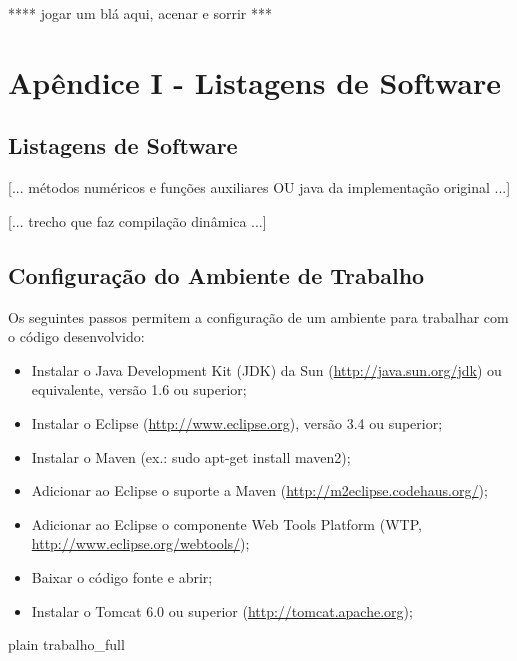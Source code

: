 \documentclass{abnt}
\begin{document}
**** jogar um blá aqui, acenar e sorrir ***

\appendix
\chapter {Apêndice I - Listagens de Software}
\section {Listagens de Software}

[... métodos numéricos e funções auxiliares OU java da implementação original ...]

[... trecho que faz compilação dinâmica ...]

\section {Configuração do Ambiente de Trabalho}

Os seguintes passos permitem a configuração de um ambiente para trabalhar com o código desenvolvido:

\begin{itemize}
\item Instalar o Java Development Kit (JDK) da Sun (\url{http://java.sun.org/jdk}) ou equivalente, versão 1.6 ou superior;
\item Instalar o Eclipse (\url{http://www.eclipse.org}), versão 3.4 ou superior;
\item Instalar o Maven (ex.: sudo apt-get install maven2);
\item Adicionar ao Eclipse o suporte a Maven (\url{http://m2eclipse.codehaus.org/});
\item Adicionar ao Eclipse o componente Web Tools Platform (WTP, \url{http://www.eclipse.org/webtools/});
\item Baixar o código fonte e abrir;
\item Instalar o Tomcat 6.0 ou superior (\url{http://tomcat.apache.org});
\end{itemize}

\nocite{*}
 {plain}
 {trabalho_full}
\end{document}
